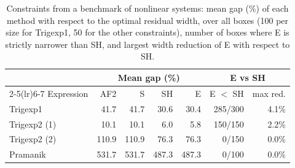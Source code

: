 \begin{table}[t]
\centering
\caption{Constraints from a benchmark of nonlinear systems: mean gap (\%) of each method with respect to the optimal residual width, over all boxes (100 per size for Trigexp1, 50 for the other constraints), number of boxes where E is strictly narrower than SH, and largest width reduction of E with respect to SH.}
\label{tab:constraints}
\small
\setlength{\tabcolsep}{4pt}
\begin{tabular}{lrrrrrr}
\toprule
 & \multicolumn{4}{c}{Mean gap (\%)} & \multicolumn{2}{c}{E vs SH} \\
\cmidrule(lr){2-5}\cmidrule(lr){6-7}
Expression & AF2 & S & SH & E & E $<$ SH & max red. \\
\midrule
Trigexp1 & 41.7 & 41.7 & 30.6 & 30.4 & 285/300 & 4.1\% \\
Trigexp2 (1) & 10.1 & 10.1 & 6.0 & 5.8 & 150/150 & 2.2\% \\
Trigexp2 (2) & 110.9 & 110.9 & 76.3 & 76.3 & 0/150 & 0.0\% \\
Pramanik & 531.7 & 531.7 & 487.3 & 487.3 & 0/100 & 0.0\% \\
\bottomrule
\end{tabular}
\end{table}